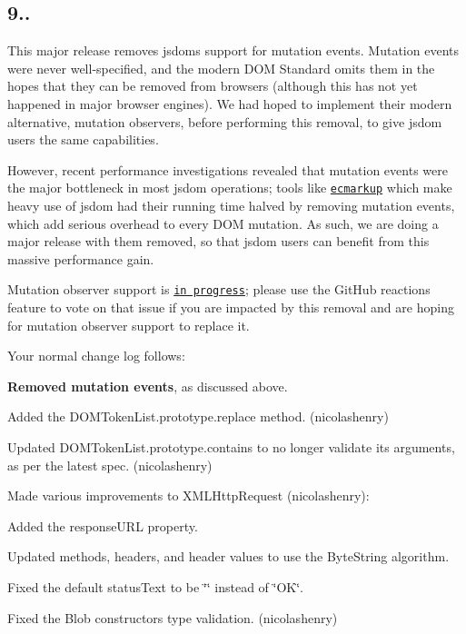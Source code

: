 \subsection*{9..}

This major release removes jsdom\textquotesingle{}s support for mutation events. Mutation events were never well-\/specified, and the modern D\+OM Standard omits them in the hopes that they can be removed from browsers (although this has not yet happened in major browser engines). We had hoped to implement their modern alternative, mutation observers, before performing this removal, to give jsdom users the same capabilities.

However, recent performance investigations revealed that mutation events were the major bottleneck in most jsdom operations; tools like \href{https://github.com/bterlson/ecmarkup}{\tt ecmarkup} which make heavy use of jsdom had their running time halved by removing mutation events, which add serious overhead to every D\+OM mutation. As such, we are doing a major release with them removed, so that jsdom users can benefit from this massive performance gain.

Mutation observer support is \href{https://github.com/tmpvar/jsdom/issues/639}{\tt in progress}; please use the Git\+Hub reactions feature to vote on that issue if you are impacted by this removal and are hoping for mutation observer support to replace it.

Your normal change log follows\+:


\begin{DoxyItemize}
\item {\bfseries Removed mutation events}, as discussed above.
\item Added the {\ttfamily D\+O\+M\+Token\+List.\+prototype.\+replace} method. (nicolashenry)
\item Updated {\ttfamily D\+O\+M\+Token\+List.\+prototype.\+contains} to no longer validate its arguments, as per the latest spec. (nicolashenry)
\item Made various improvements to X\+M\+L\+Http\+Request (nicolashenry)\+:
\begin{DoxyItemize}
\item Added the {\ttfamily response\+U\+RL} property.
\item Updated methods, headers, and header values to use the {\ttfamily Byte\+String} algorithm.
\item Fixed the default {\ttfamily status\+Text} to be {\ttfamily \char`\"{}\char`\"{}} instead of {\ttfamily \char`\"{}\+O\+K\char`\"{}}.
\end{DoxyItemize}
\item Fixed the {\ttfamily Blob} constructor\textquotesingle{}s {\ttfamily type} validation. (nicolashenry)
\end{DoxyItemize}

